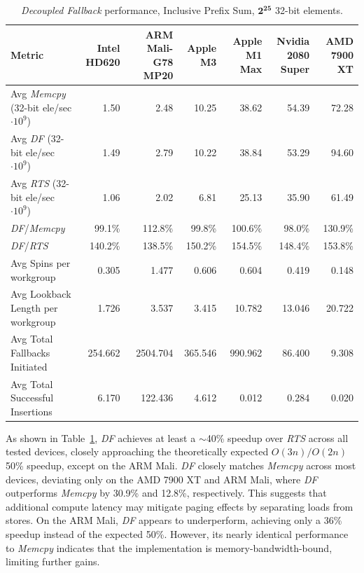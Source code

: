\documentclass[acmsmall, manuscript, screen, review, anonymous]{acmart}
\begin{document}
\begin{table}
  \centering
  \small
  \setlength{\tabcolsep}{1pt}
  \begin{tabular*}{\textwidth}{@{\extracolsep{\fill}} l r r r r r r}
    \toprule
    Metric & \!\!\!\!\!\!Intel HD620 & ARM Mali-G78 MP20 & Apple M3 & Apple M1 Max & Nvidia 2080 Super & AMD 7900 XT \\
    \midrule
    Avg \emph{Memcpy} (32-bit ele/sec $\cdot 10^9$)  & 1.50   & 2.48  & 10.25  & 38.62  & 54.39  & 72.28  \\
    Avg \emph{DF} (32-bit ele/sec $\cdot 10^9$)   & 1.49   & 2.79  & 10.22  & 38.84  & 53.29  & 94.60  \\
    Avg \emph{RTS} (32-bit ele/sec $\cdot 10^9$)      & 1.06   & 2.02  & 6.81   & 25.13  & 35.90  & 61.49  \\
    \emph{DF}/\emph{Memcpy}       & 99.1\%    & 112.8\%  & 99.8\%    & 100.6\%   & 98.0\%    & 130.9\%   \\
    \emph{DF}/\emph{RTS}          & 140.2\%   & 138.5\%  & 150.2\%   & 154.5\%   & 148.4\%   & 153.8\%   \\
    Avg Spins per workgroup    & 0.305    & 1.477    & 0.606    & 0.604    & 0.419    & 0.148    \\
    Avg Lookback Length per workgroup& 1.726    & 3.537    & 3.415    & 10.782   & 13.046   & 20.722   \\
    Avg Total Fallbacks Initiated      & 254.662   & 2504.704  & 365.546   & 990.962   & 86.400   & 9.308   \\
    Avg Total Successful Insertions    & 6.170     & 122.436   & 4.612     & 0.012    & 0.284    & 0.020    \\
    \bottomrule
  \end{tabular*}
  \caption{\emph{Decoupled Fallback} performance, Inclusive Prefix Sum, $\mathbf{2^{25}}$ 32-bit elements.\label{tab:results}}
\end{table}

As shown in Table~\ref{tab:results}, \emph{DF} achieves at least a $\sim$40\% speedup over \emph{RTS} across all tested devices, closely approaching the theoretically expected $O(3n)/O(2n)$ 50\% speedup, except on the ARM Mali. \emph{DF} closely matches \emph{Memcpy} across most devices, deviating only on the AMD 7900 XT and ARM Mali, where \emph{DF} outperforms \emph{Memcpy} by 30.9\% and 12.8\%, respectively. This suggests that additional compute latency may mitigate paging effects by separating loads from stores. On the ARM Mali, \emph{DF} appears to underperform, achieving only a 36\% speedup instead of the expected 50\%. However, its nearly identical performance to \emph{Memcpy} indicates that the implementation is memory-bandwidth-bound, limiting further gains.
\end{document}

